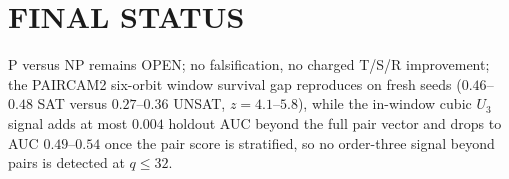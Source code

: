\documentclass[11pt]{article}
\begin{document}
\section*{FINAL STATUS}
P versus NP remains OPEN; no falsification, no charged T/S/R improvement; the PAIRCAM2 six-orbit window survival gap reproduces on fresh seeds ($0.46$--$0.48$ SAT versus $0.27$--$0.36$ UNSAT, $z=4.1$--$5.8$), while the in-window cubic $U_3$ signal adds at most $0.004$ holdout AUC beyond the full pair vector and drops to AUC $0.49$--$0.54$ once the pair score is stratified, so no order-three signal beyond pairs is detected at $q\le32$.
\end{document}

